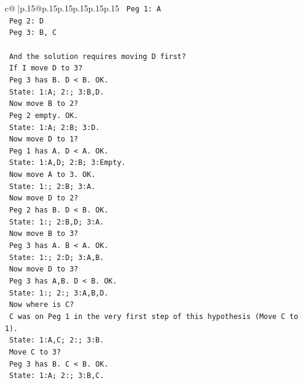 \documentclass{article}
\begin{document}
{\begin{supertabular}{c@{$\;$}|p{.15\linewidth}@{}p{.15\linewidth}p{.15\linewidth}p{.15\linewidth}p{.15\linewidth}p{.15\linewidth}}
{{{\texttt{            Peg 1: A} \\
\texttt{            Peg 2: D} \\
\texttt{            Peg 3: B, C} \\
\\ 
\texttt{            And the solution requires moving D first?} \\
\texttt{            If I move D to 3?} \\
\texttt{            Peg 3 has B. D < B. OK.} \\
\texttt{            State: 1:A; 2:; 3:B,D.} \\
\texttt{            Now move B to 2?} \\
\texttt{            Peg 2 empty. OK.} \\
\texttt{            State: 1:A; 2:B; 3:D.} \\
\texttt{            Now move D to 1?} \\
\texttt{            Peg 1 has A. D < A. OK.} \\
\texttt{            State: 1:A,D; 2:B; 3:Empty.} \\
\texttt{            Now move A to 3. OK.} \\
\texttt{            State: 1:; 2:B; 3:A.} \\
\texttt{            Now move D to 2?} \\
\texttt{            Peg 2 has B. D < B. OK.} \\
\texttt{            State: 1:; 2:B,D; 3:A.} \\
\texttt{            Now move B to 3?} \\
\texttt{            Peg 3 has A. B < A. OK.} \\
\texttt{            State: 1:; 2:D; 3:A,B.} \\
\texttt{            Now move D to 3?} \\
\texttt{            Peg 3 has A,B. D < B. OK.} \\
\texttt{            State: 1:; 2:; 3:A,B,D.} \\
\texttt{            Now where is C?} \\
\texttt{            C was on Peg 1 in the very first step of this hypothesis (Move C to 1).} \\
\texttt{            State: 1:A,C; 2:; 3:B.} \\
\texttt{            Move C to 3?} \\
\texttt{            Peg 3 has B. C < B. OK.} \\
\texttt{            State: 1:A; 2:; 3:B,C.} \\
}}}
\end{supertabular}}
\end{document}
